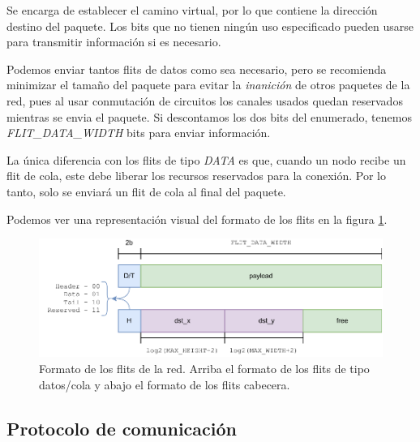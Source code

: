 \begin{description}[noitemsep]
    \item [Cabecera] Se encarga de establecer el camino virtual, por lo que contiene la dirección destino del paquete. Los bits que no tienen ningún uso especificado pueden usarse para transmitir información si es necesario.
    \item [Datos] Podemos enviar tantos flits de datos como sea necesario, pero se recomienda minimizar el tamaño del paquete para evitar la \textit{inanición} de otros paquetes de la red, pues al usar conmutación de circuitos los canales usados quedan reservados mientras se envia el paquete. Si descontamos los dos bits del enumerado, tenemos \textit{FLIT\_DATA\_WIDTH} bits para enviar información.
    \item [Cola] La única diferencia con los flits de tipo \textit{DATA} es que, cuando un nodo recibe un flit de cola, este debe liberar los recursos reservados para la conexión. Por lo tanto, solo se enviará un flit de cola al final del paquete.
\end{description}

Podemos ver una representación visual del formato de los flits en la figura \ref{fig:flits_format}.

\begin{figure}[h]
    \centering
    \includegraphics{images/diagrams/flit_format.drawio.pdf}
    \caption[Formato de los flits de la red]{Formato de los flits de la red. Arriba el formato de los flits de tipo datos/cola y abajo el formato de los flits cabecera.}
    \label{fig:flits_format}
\end{figure}

\subsection{Protocolo de comunicación}
\label{subsec:noc_protocolo}

